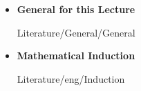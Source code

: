 \begin{frame}{\LectureFurtherLiterature}
  \begin{itemize}
    \item
      \textbf{General for this Lecture}
      \begin{btSect}{Literature/General/General}
        \btPrintAll
      \end{btSect}
  \end{itemize}
\end{frame}


\begin{frame}{\LectureFurtherLiterature}
  \begin{itemize}
    \item
      \textbf{Mathematical Induction}
      \begin{btSect}{Literature/eng/Induction}
        \btPrintAll
      \end{btSect}
  \end{itemize}
\end{frame}